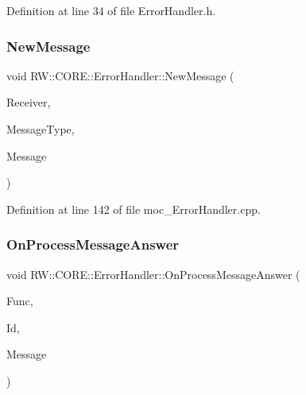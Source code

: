 Definition at line 34 of file Error\+Handler.\+h.

\hypertarget{class_r_w_1_1_c_o_r_e_1_1_error_handler_ad85d6dc6e06eec5d8709969600fbf059}{}\label{class_r_w_1_1_c_o_r_e_1_1_error_handler_ad85d6dc6e06eec5d8709969600fbf059} 
\subsubsection{\texorpdfstring{New\+Message}{NewMessage}}
{\footnotesize\ttfamily void R\+W\+::\+C\+O\+R\+E\+::\+Error\+Handler\+::\+New\+Message (\begin{DoxyParamCaption}\item[{Util\+::\+Message\+Receiver}]{Receiver,  }\item[{Util\+::\+Functions}]{Message\+Type,  }\item[{Q\+Byte\+Array}]{Message }\end{DoxyParamCaption})\hspace{0.3cm}{\ttfamily [signal]}}



Definition at line 142 of file moc\+\_\+\+Error\+Handler.\+cpp.

\hypertarget{class_r_w_1_1_c_o_r_e_1_1_error_handler_a7e93cff1de31d52deb41eb509730b2f0}{}\label{class_r_w_1_1_c_o_r_e_1_1_error_handler_a7e93cff1de31d52deb41eb509730b2f0} 
\subsubsection{\texorpdfstring{On\+Process\+Message\+Answer}{OnProcessMessageAnswer}}
{\footnotesize\ttfamily void R\+W\+::\+C\+O\+R\+E\+::\+Error\+Handler\+::\+On\+Process\+Message\+Answer (\begin{DoxyParamCaption}\item[{Util\+::\+Functions}]{Func,  }\item[{Util\+::\+Error\+ID}]{Id,  }\item[{Q\+Byte\+Array}]{Message }\end{DoxyParamCaption})\hspace{0.3cm}{\ttfamily [slot]}}




